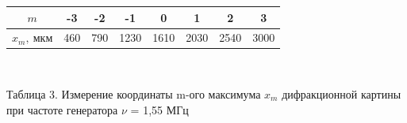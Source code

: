 \documentclass[a4paper,12pt]{article}
\begin{document}
\begin{center}
\begin{tabular}{|c|c|c|c|c|c|c|c|}
	\hline
	$m$ &-3&-2&-1&0&1&2&3\\
	\hline
	$x_m, \ \text{мкм}$ &460&790& 1230&1610&2030&2540&3000\\
	\hline
\end{tabular}

\


Таблица 3. Измерение координаты m-ого максимума $x_m$ дифракционной картины при частоте генератора $\nu$ = 1,55 МГц
\end{center}

\

\end{document}
